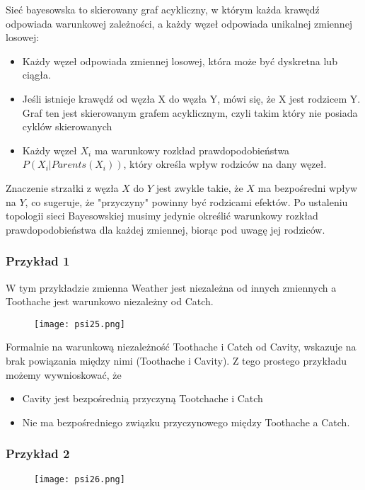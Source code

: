 \documentclass[a4paper,15pt]{article}
\begin{document}
Sieć bayesowska to skierowany graf acykliczny, w którym każda krawędź odpowiada warunkowej zależności, a każdy węzeł odpowiada unikalnej zmiennej losowej:
\begin{itemize}
\item Każdy węzeł odpowiada zmiennej losowej, która może być dyskretna lub ciągła.
\item Jeśli istnieje krawędź od węzła X do węzła Y, mówi się, że X jest rodzicem Y. Graf ten jest skierowanym grafem acyklicznym, czyli takim który nie posiada cyklów skierowanych
\item Każdy węzeł $X_i$ ma warunkowy rozkład prawdopodobieństwa $P(X_i | Parents (X_i))$, który określa wpływ rodziców na dany węzeł.
\end{itemize}
Znaczenie strzałki z węzła $X$ do $Y$ jest zwykle takie, że $X$ ma bezpośredni wpływ na $Y$, co sugeruje, że "przyczyny" powinny być rodzicami efektów. Po ustaleniu topologii sieci Bayesowskiej musimy jedynie określić warunkowy rozkład prawdopodobieństwa dla każdej zmiennej, biorąc pod uwagę jej rodziców. 

\subsubsection{Przykład 1}
W tym przykładzie zmienna Weather jest niezależna od innych zmiennych a Toothache jest warunkowo niezależny od Catch.

\begin{figure}[H]
\centerline{\texttt{[image: psi25.png]}}
\end{figure}

Formalnie na warunkową niezależność Toothache i Catch od Cavity, wskazuje na brak powiązania między nimi (Toothache i Cavity). Z tego prostego przykładu możemy wywnioskować, że 
\begin{itemize}
\item Cavity jest bezpośrednią przyczyną Tootchache i Catch
\item Nie ma bezpośredniego związku przyczynowego między Toothache a Catch.
\end{itemize}

\subsubsection{Przykład 2}

\begin{figure}[H]
\centerline{\texttt{[image: psi26.png]}}
\end{figure}
\end{document}
